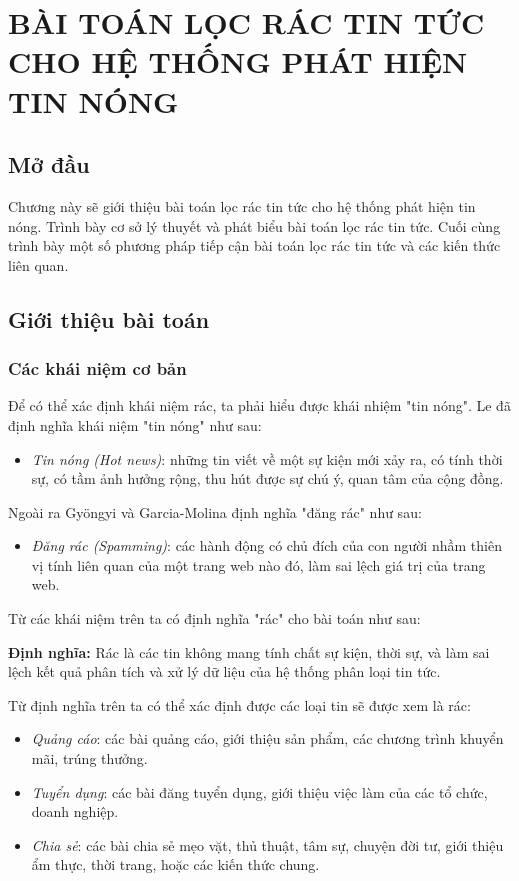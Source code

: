 \chapter{BÀI TOÁN LỌC RÁC TIN TỨC CHO HỆ THỐNG PHÁT HIỆN TIN NÓNG}
\ifpdf
    \graphicspath{{Chapter2/Chapter2Figs/PNG/}{Chapter2/Chapter2Figs/PDF/}{Chapter2/Chapter2Figs/}}
\else
    \graphicspath{{Chapter2/Chapter2Figs/EPS/}{Chapter2/Chapter2Figs/}}
\fi

\section{Mở đầu}
Chương này sẽ giới thiệu bài toán lọc rác tin tức cho hệ thống phát hiện tin nóng. Trình bày cơ sở lý thuyết và phát biểu bài toán lọc rác tin tức. Cuối cùng trình bày một số phương pháp tiếp cận bài toán lọc rác tin tức  và các kiến thức liên quan.
\section{Giới thiệu bài toán} %
	\subsection{Các khái niệm cơ bản}
  Để có thể xác định khái niệm rác, ta phải hiểu được khái nhiệm "tin nóng". Le \cite{An:2017} đã định nghĩa khái niệm "tin nóng" như sau:
	\begin{itemize}
    \item \textit{Tin nóng (Hot news)}: những tin viết về một sự kiện mới xảy ra, có tính thời sự, có tầm ảnh hưởng rộng, thu hút được sự chú ý, quan tâm của cộng đồng.
	\end{itemize}

  Ngoài ra Gy\"{o}ngyi và Garcia-Molina định nghĩa "đăng rác" như sau: 
	\begin{itemize}
    \item \textit{Đăng rác (Spamming)}: các hành động có chủ đích của con người nhầm thiên vị tính liên quan của một trang web nào đó, làm sai lệch giá trị của trang web.
	\end{itemize}

  Từ các khái niệm trên ta có định nghĩa "rác" cho bài toán như sau:

  \textbf{Định nghĩa:} Rác là các tin không mang tính chất sự kiện, thời sự, và làm sai lệch kết quả phân tích và xử lý dữ liệu của hệ thống phân loại tin tức. 

  Từ định nghĩa trên ta có thể xác định được các loại tin sẽ được xem là rác:
  \begin{itemize}
    \item \textit{Quảng cáo}: các bài quảng cáo, giới thiệu sản phẩm, các chương trình khuyển mãi, trúng thưởng.
    \item \textit{Tuyển dụng}: các bài đăng tuyển dụng, giới thiệu việc làm của các tổ chức, doanh nghiệp.
    \item \textit{Chia sẻ}: các bài chia sẻ mẹo vặt, thủ thuật, tâm sự, chuyện đời tư, giới thiệu ẩm thực, thời trang, hoặc các kiến thức chung.
  \end{itemize}

